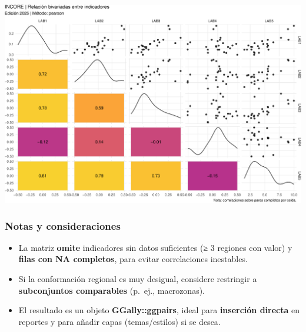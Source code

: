 \documentclass[
  11pt,
  letterpaper,
  DIV=11,
  numbers=noendperiod]{scrartcl}
\begin{document}
\includegraphics{Manual_files/figure-pdf/unnamed-chunk-115-1.pdf}

\subsubsection{\texorpdfstring{\textbf{Notas y
consideraciones}}{Notas y consideraciones}}\label{notas-y-consideraciones}

\begin{itemize}
\item
  La matriz \textbf{omite} indicadores sin datos suficientes (≥ 3
  regiones con valor) y \textbf{filas con NA completos}, para evitar
  correlaciones inestables.
\item
  Si la conformación regional es muy desigual, considere restringir a
  \textbf{subconjuntos comparables} (p.~ej., macrozonas).
\item
  El resultado es un objeto \textbf{GGally::ggpairs}, ideal para
  \textbf{inserción directa} en reportes y para añadir capas
  (temas/estilos) si se desea.
\end{itemize}
\end{document}
